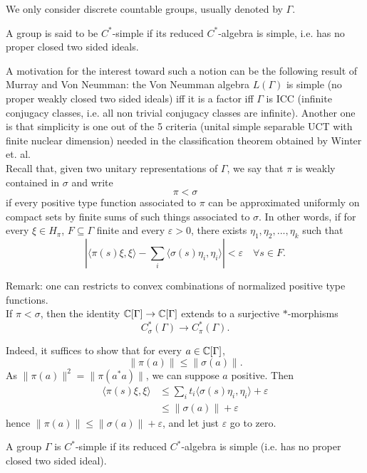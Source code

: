 We only consider discrete countable groups, usually denoted by $\Gamma$.

\begin{definition}
A group is said to be $C^*$-simple if its reduced $C^*$-algebra is simple, i.e. has no proper closed two sided ideals. 
\end{definition}

A motivation for the interest toward such a notion can be the following result of Murray and Von Neumman: the Von Neumman algebra $L(\Gamma)$ is simple (no proper weakly closed two sided ideals) iff it is a factor iff $\Gamma$ is ICC (infinite conjugacy classes, i.e. all non trivial conjugacy classes are infinite). Another one is that simplicity is one out of the 5 criteria (unital simple separable UCT with finite nuclear dimension) needed in the classification theorem obtained by Winter et. al.\\  

Recall that, given two unitary representations of $\Gamma$, we say that $\pi$ is weakly contained in $\sigma$ and write 
\[\pi < \sigma\]
if every positive type function associated to $\pi$ can be approximated uniformly on compact sets by finite sums of such things associated to $\sigma$. In other words, if for every $\xi \in H_\pi$, $F\subseteq \Gamma$ finite and every $\varepsilon >0$, there exists $ \eta_1, \eta_2, ... , \eta_k$ such that
\[ | \langle \pi(s)\xi, \xi\rangle - \sum_i \langle \sigma (s)\eta_i,\eta_i \rangle| < \varepsilon \quad \forall s\in F.\]

Remark: one can restricts to convex combinations of normalized positive type functions.\\ 

If $\pi < \sigma$, then the identity $\mathbb C [\Gamma] \rightarrow \mathbb C [\Gamma]$ extends to a surjective $*$-morphisms
\[C_\sigma^*(\Gamma) \rightarrow C_\pi^*(\Gamma).\]

Indeed, it suffices to show that for every $a\in \mathbb C [\Gamma]$, \[ \| \pi(a)\| \leq \| \sigma(a)\|. \]
As $\| \pi(a)\|^2 = \| \pi(a^*a)\|$, we can suppose $a$ positive. Then
\[\begin{split}
 \langle \pi(s)\xi, \xi\rangle  & \leq   \sum_i t_i \langle \sigma (s)\eta_i,\eta_i \rangle +\varepsilon \\
				& \leq \| \sigma(a)\|+ \varepsilon
\end{split}\]
hence $\| \pi(a)\| \leq \| \sigma(a)\| +\varepsilon$, and let just $\varepsilon $ go to zero.

\begin{definition}
A group $\Gamma$ is $C^*$-simple if its reduced $C^*$-algebra is simple (i.e. has no proper closed two sided ideal).
\end{definition}

